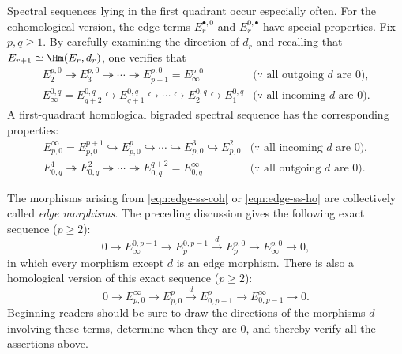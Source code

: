 \begin{remark}\label{rem:edge-computing}
	Spectral sequences lying in the first quadrant occur especially often. For
	the cohomological version, the edge terms $E_r^{\bullet,0}$ and
	$E_r^{0,\bullet}$ have special properties. Fix $p,q\geq1$. By carefully
	examining the direction of $d_r$ and recalling that
	$E_{r+1}\simeq\Hm(E_r,d_r)$, one verifies that
	\begin{equation}\label{eqn:edge-ss-coh}\begin{array}{cc}
		E_2^{p,0}\twoheadrightarrow E_3^{p,0}\twoheadrightarrow\cdots
		\twoheadrightarrow E_{p+1}^{p,0}=E_\infty^{p,0}
		& \text{($\because$ all outgoing $d$ are $0$)}, \\
		E_\infty^{0,q}=E_{q+2}^{0,q}\hookrightarrow E_{q+1}^{0,q}
		\hookrightarrow\cdots\hookrightarrow E_2^{0,q}\hookrightarrow E_1^{0,q}
		& \text{($\because$ all incoming $d$ are $0$)}.
	\end{array}\end{equation}
	A first-quadrant homological bigraded spectral sequence has the corresponding
	properties:
	\begin{equation}\label{eqn:edge-ss-ho}\begin{array}{cc}
		E^\infty_{p,0}=E^{p+1}_{p,0}\hookrightarrow E^p_{p,0}
		\hookrightarrow\cdots\hookrightarrow E^3_{p,0}\hookrightarrow E^2_{p,0}
		& \text{($\because$ all incoming $d$ are $0$)}, \\
		E^1_{0,q}\twoheadrightarrow E^2_{0,q}\twoheadrightarrow\cdots
		\twoheadrightarrow E^{q+2}_{0,q}=E^\infty_{0,q}
		& \text{($\because$ all outgoing $d$ are $0$)}.
	\end{array}\end{equation}

	The morphisms arising from \eqref{eqn:edge-ss-coh} or
	\eqref{eqn:edge-ss-ho} are collectively called \emph{edge morphisms}.
	The preceding discussion gives the following exact sequence ($p\geq2$):
	\begin{equation}\label{eqn:low-exact-coh}
		0\to E^{0,p-1}_\infty\to E^{0,p-1}_p\xrightarrow{d}E^{p,0}_p
		\to E^{p,0}_\infty\to0,
	\end{equation}
	in which every morphism except $d$ is an edge morphism. There is also a
	homological version of this exact sequence ($p\geq2$):
	\begin{equation}\label{eqn:low-exact-ho}
		0\to E^\infty_{p,0}\to E^p_{p,0}\xrightarrow{d}E^p_{0,p-1}
		\to E^\infty_{0,p-1}\to0.
	\end{equation}
	Beginning readers should be sure to draw the directions of the morphisms
	$d$ involving these terms, determine when they are $0$, and thereby verify
	all the assertions above.
\end{remark}
